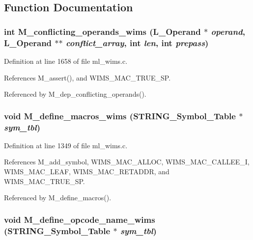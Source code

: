 \subsection{Function Documentation}
\subsubsection{\setlength{\rightskip}{0pt plus 5cm}int M\_\-conflicting\_\-operands\_\-wims (L\_\-Operand $\ast$ {\em operand}, L\_\-Operand $\ast$$\ast$ {\em conflict\_\-array}, int {\em len}, int {\em prepass})}\label{m__wims_8h_79887eb474ee939c6542081d64a9c520}




Definition at line 1658 of file ml\_\-wims.c.

References M\_\-assert(), and WIMS\_\-MAC\_\-TRUE\_\-SP.

Referenced by M\_\-dep\_\-conflicting\_\-operands().
\subsubsection{\setlength{\rightskip}{0pt plus 5cm}void M\_\-define\_\-macros\_\-wims (\bf{STRING\_\-Symbol\_\-Table} $\ast$ {\em sym\_\-tbl})}\label{m__wims_8h_5e1c8e632e72f22aa891e7d808aa77b4}




Definition at line 1349 of file ml\_\-wims.c.

References M\_\-add\_\-symbol, WIMS\_\-MAC\_\-ALLOC, WIMS\_\-MAC\_\-CALLEE\_\-I, WIMS\_\-MAC\_\-LEAF, WIMS\_\-MAC\_\-RETADDR, and WIMS\_\-MAC\_\-TRUE\_\-SP.

Referenced by M\_\-define\_\-macros().
\subsubsection{\setlength{\rightskip}{0pt plus 5cm}void M\_\-define\_\-opcode\_\-name\_\-wims (\bf{STRING\_\-Symbol\_\-Table} $\ast$ {\em sym\_\-tbl})}\label{m__wims_8h_0e78c613c5ab154c04604c59340153d4}




